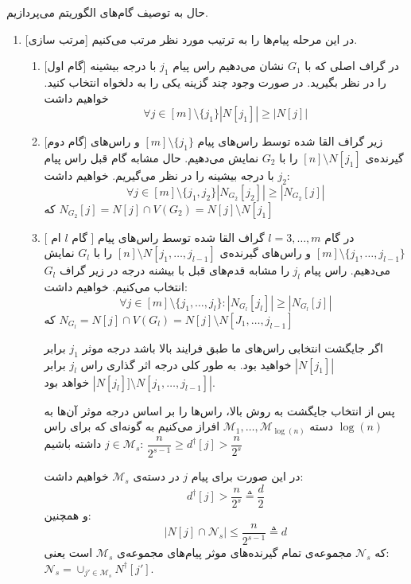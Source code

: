 حال به توصیف گام‌های الگوریتم می‌پردازیم.
\begin{enumerate}
	\item{[مرتب سازی]}
	در این مرحله پیام‌ها را به ترتیب مورد نظر مرتب می‌کنیم.
		\begin{enumerate}
			\item{[گام اول]}
			در گراف اصلی که با
			$G_1$
			نشان می‌دهیم راس پیام
			$j_1$
			با درجه بیشینه را در نظر بگیرید. در صورت وجود چند گزینه یکی را به دلخواه انتخاب کنید. خواهیم داشت
			$$\forall j \in [m] \setminus \{j_1\} |N[j_1]| \geq |N[j]|$$
			\item{[گام دوم]}
			زیر گراف القا شده توسط راس‌های پیام
			$[m] \setminus \{j_1\}$
			و راس‌های گیرنده‌ی
			$[n] \setminus N[j_1]$
			را با
		   $G_2$
		   نمایش می‌دهیم. حال مشابه گام قبل راس پیام
		   $j_2$
		   با درجه بیشینه را در نظر می‌گیریم. خواهیم داشت:
		   $$\forall j \in [m] \setminus \{j_1, j_2\} |N_{G_2}[j_2]| \geq |N_{G_2}[j]|$$
		   که
		   $N_{G_2}[j] = N[j] \cap V(G_2) = N[j] \setminus N[j_1]$
			\item{[
			گام $l$ ام
			]}
			در گام
			$l = 3, \ldots, m$
			گراف القا شده توسط راس‌های پیام
			$[m] \setminus \{j_1, \ldots, j_{l - 1}\}$
			و راس‌های گیرنده‌ی
			$[n] \setminus N[j_1, \ldots, j_{l-1} ]$
			را با
			$G_l$
			نمایش می‌دهیم. راس پیام
			$j_l$
			را مشابه قدم‌های قبل با بیشنه درجه در زیر گراف
			$G_l$
			 انتخاب می‌کنیم. خواهیم داشت:
			 $$\forall j \in [m] \setminus \{j_1, \ldots, j_l\}: |N_{G_l}[j_l]| \geq |N_{G_l} [j]|$$
			 که
			 $N_{G_l} = N[j] \cap V(G_l) = N[j] \setminus N[J_1, \ldots, j_{l - 1}] $
			
			اگر جایگشت انتخابی راس‌های ما طبق فرایند بالا باشد درجه موثر 
			$j_1$
			برابر
			$|N[j_1]|$
			 خواهید بود. به طور کلی درجه اثر گذاری راس
			 $j_l$
			 برابر
			 $|N[j_l]]\setminus N[j_1, \ldots, j_{l-1}]|$
			 خواهد بود.
			 
			 پس از انتخاب جایگشت به روش بالا، راس‌ها را بر اساس درجه موثر آن‌ها به
			 $\log(n)$
			 دسته 
			 $\mathcal{M}_1, \ldots, \mathcal{M}_{\log(n)}$
			 افراز می‌کنیم به گونه‌ای که برای راس
			 $j \in \mathcal{M}_s$
			 داشته باشیم:
			 $\dfrac{n}{2^{s - 1}} \geq d^\dagger[j] > \dfrac{n}{2^s}$
			 
			 در این صورت برای پیام
			 $j$
			 در دسته‌ی
			 $\mathcal{M}_s$
			 خواهیم داشت:
			 $$d^{\dagger}[j] > \dfrac{n}{2^s} \triangleq \dfrac{d}{2}$$
			 و همچنین:
			 $$|N[j] \cap \mathcal{N}_s| \leq \dfrac{n}{2^{s - 1}} \triangleq d$$
			 که
			 $\mathcal{N}_s$
			 مجموعه‌ی تمام گیرنده‌های موثر پیام‌های مجموعه‌ی
			 $\mathcal{M}_s$
			 است یعنی:
			 $\mathcal{N}_s = \cup_{j' \in \mathcal{M}_s} N^{\dagger}[j']$.
			 

\end{enumerate}
\end{enumerate}
